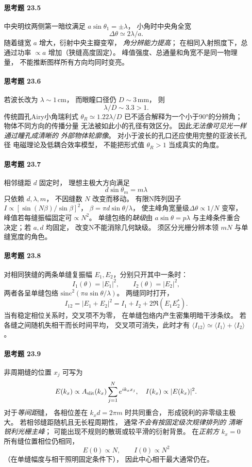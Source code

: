 \paragraph{思考题 23.5}
中央明纹两侧第一暗纹满足
\(a\sin\theta_1=\pm\lambda\)，
小角时中央角全宽
\[
\boxed{\Delta\theta\simeq2\lambda/a}.
\]
随着缝宽 \(a\) 增大，衍射中央主瓣变窄，
\emph{角分辨能力提高}；
在相同入射照度下，总通过功率
\(\propto a\) 增加（狭缝高度固定）。
峰值强度、总通量和角宽不是同一物理量，
不能推断图样所有方向均同时变亮。

\paragraph{思考题 23.6}
若波长改为
\(\lambda\sim1\,\mathrm{cm}\)，
而眼瞳口径仍 \(D\sim3\,\mathrm{mm}\)，
则
\[
\boxed{\lambda/D\sim3.3>1}.
\]
传统圆孔Airy小角瑞利式
\(\theta_R\simeq1.22\lambda/D\)
已不适合解释为一个小于90°的分辨角；
物体不同方向的传播分量
无法被如此小的孔径有效区分。
因此\emph{无法像可见光一样通过瞳孔成清晰的
外部物体轮廓像}。
对小于波长的孔口还应使用完整的亚波长孔径
电磁理论及低耦合效率模型，
不能把形式值 \(\theta_R>1\) 当成真实的角度。

\paragraph{思考题 23.7}
相邻缝距 \(d\) 固定时，
理想主极大方向满足
\[
\boxed{d\sin\theta_m=m\lambda}
\]
只依赖 \(d,\lambda,m\)，
不因缝数 \(N\) 改变而移动。
有限N阵列因子
\(I\propto[\sin(N\beta)/\sin\beta]^2\)，
\(\beta=\pi d\sin\theta/\lambda\)，
使主峰角宽量级\(\Delta\theta\propto1/N\)
变窄，峰值若每缝振幅固定可\(\propto N^2\)。
单缝包络的\emph{缺级}由
\(a\sin\theta=p\lambda\) 与主峰条件重合
决定；若 \(a,d\) 均固定，
改变N不能消除几何缺级。
须区分光栅分辨本领 \(mN\) 与单缝宽度的角色。

\paragraph{思考题 23.8}
对相同狭缝的两条单缝复振幅
\(E_1,E_2\)，分别只开其中一条时：
\[
I_1(\theta)=|E_1|^2,\qquad
I_2(\theta)=|E_2|^2,
\]
两者各呈单缝包络
\(\mathrm{sinc}^2(\pi a\sin\theta/\lambda)\)。
两缝同时打开，
\[
\boxed{I_{12}=|E_1+E_2|^2
=I_1+I_2+2\Re(E_1E_2^*)}.
\]
当有稳定相位关系时，交叉项不为零，
在单缝包络内产生密集明暗干涉条纹。
若各缝之间随机失相干而长时间平均，
交叉项可消失，此时才有
\(\langle I_{12}\rangle
\simeq\langle I_1\rangle+\langle I_2\rangle\)。

\paragraph{思考题 23.9}
非周期缝的位置 \(x_j\) 可写为
\[
E(k_x)\propto A_{\rm slit}(k_x)
\sum_{j=1}^{N}e^{ik_xx_j},
\quad
I(k_x)\propto|E(k_x)|^2.
\]
对于\emph{等间距}缝，
各相位差在 \(k_xd=2\pi m\) 时共同重合，
形成锐利的非零级主极大。
若相邻缝距随机且无长程周期性，
通常\emph{不会有按固定级次规律排列的
清晰锐利光栅主峰}；
可能出现不规则的散斑或较平滑的衍射背景。
在\emph{正前方} \(k_x=0\)
所有缝位置相位仍相同，
\[
\boxed{E(0)\propto N,\qquad I(0)\propto N^2}
\]
（在单缝幅度与相干照明固定条件下），
因此中心相干最大通常仍在。
